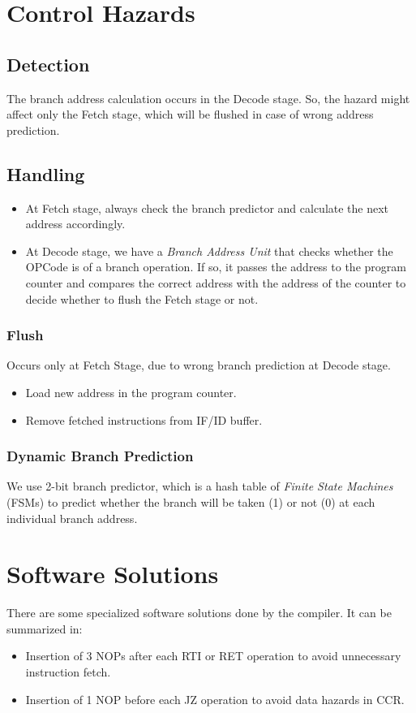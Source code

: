 \section{Control Hazards}

\subsection{Detection}
The branch address calculation occurs in the Decode stage. So, the hazard might affect only the Fetch stage, which will be flushed in case of wrong address prediction.

\subsection{Handling}
\begin{itemize}
    \item At Fetch stage, always check the branch predictor and calculate the next address accordingly.
    \item At Decode stage, we have a \emph{Branch Address Unit} that checks whether the OPCode is of a branch operation. If so, it passes the address to the program counter and compares the correct address with the address of the counter to decide whether to flush the Fetch stage or not. 
\end{itemize}

\subsubsection{Flush}
Occurs only at Fetch Stage, due to wrong branch prediction at Decode stage.
\begin{itemize}
    \item Load new address in the program counter.
    \item Remove fetched instructions from IF/ID buffer.
\end{itemize}

\subsubsection{Dynamic Branch Prediction}
We use 2-bit branch predictor, which is a hash table of \emph{Finite State Machines} (FSMs) to predict whether the branch will be taken (1) or not (0) at each individual branch address.

\section{Software Solutions}

There are some specialized software solutions done by the compiler. It can be summarized in:
\begin{itemize}
    \item Insertion of 3 NOPs after each RTI or RET operation to avoid unnecessary instruction fetch.
    \item Insertion of 1 NOP before each JZ operation to avoid data hazards in CCR.
\end{itemize}